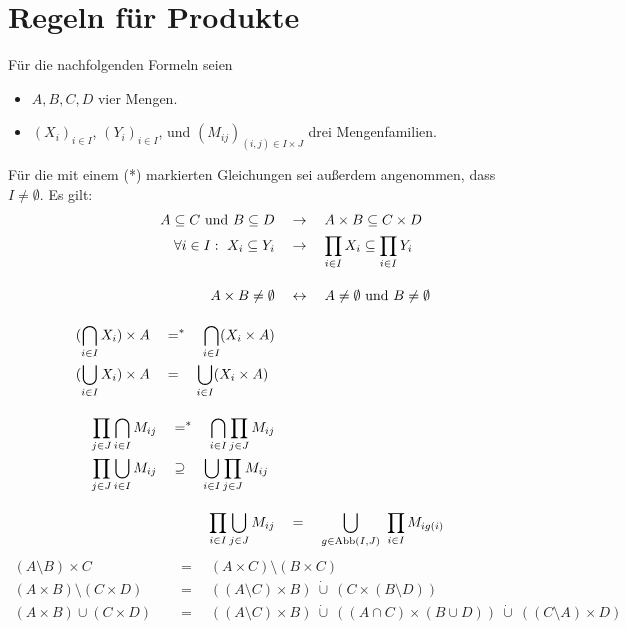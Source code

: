 \section{Regeln für Produkte}
Für die nachfolgenden Formeln seien
\begin{itemize}
    \item $A,B,C,D$ vier Mengen.
    \item $(X_i)_{i\in I}$, $(Y_i)_{i\in I}$, und $(M_{ij})_{(i,j)\in I\times J}$ drei Mengenfamilien.
\end{itemize}
Für die mit einem (*) markierten Gleichungen sei außerdem angenommen, dass $I\neq\emptyset$. Es gilt:
\begingroup
\allowdisplaybreaks
\begin{align*}
    A\subseteq C\ \text{und}\ B\subseteq D & \quad\to\quad A\times B\subseteq C\times D \\
    \forall i\in I:\ X_i\subseteq Y_i & \quad\to\quad \prod_{i\in I} X_i \subseteq \prod_{i\in I} Y_i \\[1em]
    A\times B \neq \emptyset & \quad \leftrightarrow\quad A\neq \emptyset \ \text{und}\ B\neq \emptyset \\[1em]
    \begin{split}
        (\bigcap_{i\in I} X_i ) \times A & \quad =^* \quad \bigcap_{i\in I} ( X_i \times A )  \\
        (\bigcup_{i\in I} X_i ) \times A & \quad = \quad \bigcup_{i\in I} ( X_i \times A)
    \end{split} \\[1em]
    \begin{split}
        \prod_{j \in J} \bigcap_{i \in I} M_{ij} & \quad =^* \quad \bigcap_{i\in I} \prod_{j\in J} M_{ij} \\
        \prod_{j \in J} \bigcup_{i\in I} M_{ij} & \quad\supseteq\quad \bigcup_{i\in I} \prod_{j\in J} M_{ij}
    \end{split} \\[1em]
    \prod_{i \in I} \bigcup_{j \in J} M_{ij} & \quad =\quad \bigcup_{g \in \Abb(I,J)}\ \prod_{i \in I} M_{ig(i)} %
\end{align*}
\begin{align*}
    (A \setminus B) \times C & \quad = \quad (A \times C) \setminus (B \times C) \\
    (A \times B) \setminus (C \times D) & \quad = \quad ((A \setminus C) \times B) \ \dot\cup\ (C \times (B \setminus D)) \\ %
    (A \times B) \cup (C \times D) & \quad = \quad ((A \setminus C) \times B)  \ \dot\cup\ ((A \cap C) \times (B \cup D)) \ \dot\cup\ ((C \setminus A) \times D) %
\end{align*}
\endgroup
 

